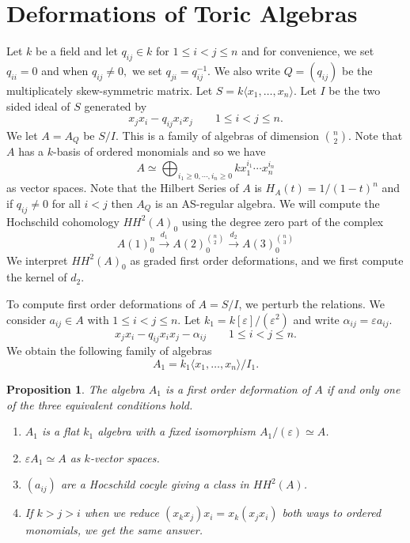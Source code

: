 \documentclass{article}
\newtheorem{proposition}{Proposition}
\begin{document}
\section{Deformations of Toric Algebras}
Let $k$ be a field and let $q_{ij} \in k$ for $1 \leq i < j \leq n$ and
for convenience, we set $q_{ii}=0$ and when $q_{ij} \neq 0,$ we set $q_{ji}=q_{ij}^{-1}$.  We also write $Q  =(q_{ij})$
be the multiplicately skew-symmetric matrix.
Let $S=k\langle x_1,\ldots,x_n\rangle$.
Let $I$ be the two sided ideal of $S$ generated by
$$x_jx_i - q_{ij} x_ix_j\quad \quad 1 \leq i < j \leq n.$$
We let $A = A_Q$ be $S/I$.  This is a family of algebras of dimension $\binom{n}{2}.$
Note that $A$ has a $k$-basis of ordered monomials and so we have
$$ A \simeq \bigoplus_{i_1\geq 0,\cdots, i_n \geq 0} k x_1^{i_1}\cdots x^{i_n}_n$$
as vector spaces.  Note that the Hilbert Series of $A$ is $H_A(t) = 1/(1-t)^n$ and if $q_{ij} \neq 0$ for all $i<j$ then $A_Q$ is an AS-regular algebra.
We will compute the Hochschild cohomology
$HH^2(A)_0$ using the degree zero part of the complex
$$ A(1)^n_0 \stackrel{d_1}{\to} A(2)^{\binom{n}{2}}_0 \stackrel{d_2}{\to}
  A(3)^{\binom{n}{3}}_0 $$
  We interpret $HH^2(A)_0$ as graded first order deformations, and we first compute the kernel of $d_2$.
  
To compute  first order deformations of $A = S/I$, we perturb the relations.
We consider $a_{ij} \in A$ with $1 \leq i < j \leq n$.
Let $k_1 = k[\varepsilon]/(\varepsilon^2)$ and write $\alpha_{ij} = \varepsilon a_{ij}$.
$$x_jx_i - q_{ij} x_ix_j  - \alpha_{ij} \quad \quad 1 \leq i < j \leq n.$$
We obtain the following family of algebras
$$A_1 = k_1\langle x_1,\ldots,x_n \rangle/I_1.$$

\begin{proposition}
  The algebra $A_1$ is a {\it first order deformation} of $A$ if and only one of the three equivalent conditions hold.
  \begin{enumerate}
    \item $A_1$ is a flat $k_1$ algebra with a fixed isomorphism $A_1/(\varepsilon) \simeq A$.
    \item $\varepsilon A_1 \simeq A$ as $k$-vector spaces.
    \item $(a_{ij})$ are a Hocschild cocyle giving a class in $HH^2(A)$.
    \item If $k>j>i$ when we reduce $(x_kx_j)x_i = x_k(x_jx_i)$ both ways to ordered monomials, we get the same answer.
  \end{enumerate}
\end{proposition}
\end{document}
